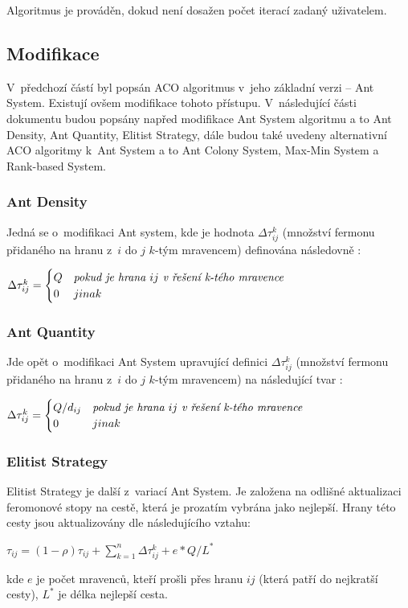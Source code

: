 \documentclass[a4paper, 12pt]{article}
\begin{document}
Algoritmus je prováděn, dokud není dosažen počet iterací zadaný uživatelem.

\subsection{Modifikace}
\label{subsec:modif}
V~předchozí částí byl popsán ACO algoritmus v~jeho základní verzi -- Ant System. Existují ovšem modifikace tohoto přístupu.
V~následující části dokumentu budou popsány napřed modifikace Ant System algoritmu a to Ant Density, Ant Quantity, Elitist Strategy, dále budou
také uvedeny alternativní ACO algoritmy k~Ant System a to Ant Colony System, Max-Min System a Rank-based System.

\subsubsection{Ant Density}
Jedná se o~modifikaci Ant system, kde je hodnota $\Delta\tau_{ij}^k$ (množství fermonu přidaného na hranu z~$i$ do $j$ $k$-tým mravencem) definována
následovně \cite{aco:variations}:
\begin{center}
  $\Delta\tau_{ij}^k = 
  \begin{cases}
    Q & \emph{pokud je hrana } ij \emph{ v~řešení k-tého mravence}\\
    0 & jinak
   \end{cases}
   $
\end{center}

\subsubsection{Ant Quantity}
Jde opět o~modifikaci Ant System upravující definici $\Delta\tau_{ij}^k$ (množství fermonu přidaného na hranu z~$i$ do $j$ $k$-tým mravencem) na následující
tvar \cite{aco:variations}:
\begin{center}
  $\Delta\tau_{ij}^k = 
  \begin{cases}
    Q/d_{ij} & \emph{pokud je hrana } ij \emph{ v~řešení k-tého mravence}\\
    0 & jinak
   \end{cases}
   $
\end{center}

\subsubsection{Elitist Strategy}
Elitist Strategy je další z~variací Ant System. Je založena na odlišné aktualizaci feromonové stopy na cestě, která je prozatím vybrána jako nejlepší.
Hrany této cesty jsou aktualizovány dle následujícího vztahu\cite{aco:variations}:
\begin{center}
  $\tau_{ij}=(1-\rho)\tau_{ij}+\sum\limits_{k=1}^{n}\Delta\tau_{ij}^k + e*Q/L^*$
\end{center}
kde $e$ je počet mravenců, kteří prošli přes hranu $ij$ (která patří do nejkratší cesty), $L^{*}$ je délka nejlepší cesta.
\end{document}
